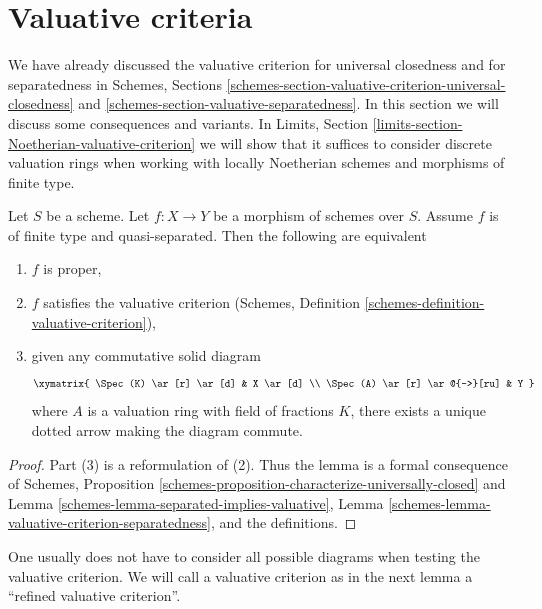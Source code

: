 \section{Valuative criteria}
\label{section-valuative-criteria}

\noindent
We have already discussed the valuative criterion for universal closedness
and for separatedness in Schemes, Sections
\ref{schemes-section-valuative-criterion-universal-closedness} and
\ref{schemes-section-valuative-separatedness}.
In this section we will discuss some consequences and variants.
In Limits, Section \ref{limits-section-Noetherian-valuative-criterion}
we will show that it suffices to consider discrete valuation
rings when working with locally Noetherian schemes and
morphisms of finite type.

\begin{lemma}
\label{lemma-characterize-proper}
\begin{reference}
\cite[II Theorem 7.3.8]{EGA}
\end{reference}
Let $S$ be a scheme. Let $f : X \to Y$ be a morphism of schemes
over $S$. Assume $f$ is of finite type and quasi-separated.
Then the following are equivalent
\begin{enumerate}
\item $f$ is proper,
\item $f$ satisfies the valuative criterion
(Schemes, Definition \ref{schemes-definition-valuative-criterion}),
\item given any commutative solid diagram
$$
\xymatrix{
\Spec(K) \ar[r] \ar[d] & X \ar[d] \\
\Spec(A) \ar[r] \ar@{-->}[ru] & Y
}
$$
where $A$ is a valuation ring with field of fractions $K$, there exists
a unique dotted arrow making the diagram commute.
\end{enumerate}
\end{lemma}

\begin{proof}
Part (3) is a reformulation of (2). Thus the lemma is a formal
consequence of
Schemes, Proposition \ref{schemes-proposition-characterize-universally-closed}
and Lemma \ref{schemes-lemma-separated-implies-valuative},
Lemma \ref{schemes-lemma-valuative-criterion-separatedness},
and the definitions.
\end{proof}

\noindent
One usually does not have to consider all possible diagrams
when testing the valuative criterion. We will call a valuative
criterion as in the next lemma a ``refined valuative criterion''.

